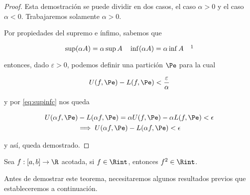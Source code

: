 \begin{proof}
    Esta demostración se puede dividir en dos casos, el caso $\alpha > 0$ y el caso $\alpha < 0$. Trabajaremos solamente $\alpha > 0$.
    
    Por propiedades del supremo e ínfimo, sabemos que
    
    \begin{equation}\label{eq:supinfc}
    \sup (\alpha A) = \alpha \sup A \quad \inf (\alpha A) = \alpha \inf A \quad \footnotemark
    \end{equation}
    
    \noindent entonces, dado $\varepsilon > 0$, podemos definir una partición $\Pe$ para la cual
    
    \[
    U(f, \Pe) - L(f, \Pe) < \frac{\varepsilon}{\alpha}
    \]
    
    \noindent y por \ref{eq:supinfc} nos queda
    
    \begin{gather*}
        U(\alpha f, \Pe) - L(\alpha f, \Pe) = \alpha U(f, \Pe) - \alpha L(f, \Pe) < \epsilon \\
        \implies U(\alpha f, \Pe) - L(\alpha f, \Pe) < \epsilon
    \end{gather*}
    
    \noindent y así, queda demostrado.
\end{proof}

\begin{teo}\label{teo:xcua}
    Sea $f: [a,b] \rightarrow \R$ acotada, si $f \in \Rint$, entonces $f^2 \in \Rint$.
\end{teo}

Antes de demostrar este teorema, necesitaremos algunos resultados previos que estableceremos a continuación.

